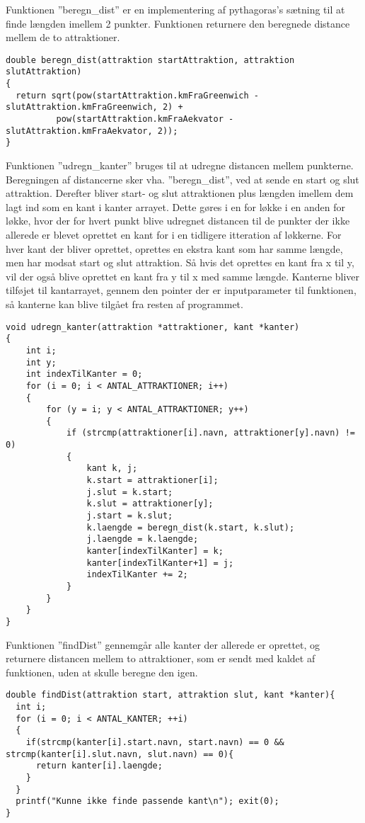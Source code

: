 Funktionen ”beregn\_dist” er en implementering af pythagoras's sætning til at finde længden imellem 2 punkter. Funktionen returnere den beregnede distance mellem de to attraktioner.

\begin{lstlisting}
double beregn_dist(attraktion startAttraktion, attraktion slutAttraktion)
{
  return sqrt(pow(startAttraktion.kmFraGreenwich - slutAttraktion.kmFraGreenwich, 2) + 
          pow(startAttraktion.kmFraAekvator - slutAttraktion.kmFraAekvator, 2));
}
\end{lstlisting}

Funktionen ”udregn\_kanter” bruges til at udregne distancen mellem punkterne. Beregningen af distancerne sker vha. ”beregn\_dist”, ved at sende en start og slut attraktion. Derefter bliver start- og slut attraktionen plus længden imellem dem lagt ind som en kant i kanter arrayet. Dette gøres i en for løkke i en anden for løkke, hvor der for hvert punkt blive udregnet distancen til de punkter der ikke allerede er blevet oprettet en kant for i en tidligere itteration af løkkerne. For hver kant der bliver oprettet, oprettes en ekstra kant som har samme længde, men har modsat start og slut attraktion. Så hvis det oprettes en kant fra x til y, vil der også blive oprettet en kant fra y til x med samme længde. Kanterne bliver tilføjet til kantarrayet, gennem den pointer der er inputparameter til funktionen, så kanterne kan blive tilgået fra resten af programmet. 

\begin{lstlisting}
void udregn_kanter(attraktion *attraktioner, kant *kanter)
{
	int i;
	int y;
	int indexTilKanter = 0;
	for (i = 0; i < ANTAL_ATTRAKTIONER; i++)
	{
		for (y = i; y < ANTAL_ATTRAKTIONER; y++)
		{
			if (strcmp(attraktioner[i].navn, attraktioner[y].navn) != 0)
			{
				kant k, j;
				k.start = attraktioner[i];
				j.slut = k.start;
				k.slut = attraktioner[y];
				j.start = k.slut;
				k.laengde = beregn_dist(k.start, k.slut);
				j.laengde = k.laengde;
				kanter[indexTilKanter] = k;
				kanter[indexTilKanter+1] = j;
				indexTilKanter += 2;
			}
		}
	}
}
\end{lstlisting}

Funktionen ”findDist” gennemgår alle kanter der allerede er oprettet, og returnere distancen mellem to attraktioner, som er sendt med kaldet af funktionen, uden at skulle beregne den igen.

\begin{lstlisting}
double findDist(attraktion start, attraktion slut, kant *kanter){
  int i;
  for (i = 0; i < ANTAL_KANTER; ++i)
  {
    if(strcmp(kanter[i].start.navn, start.navn) == 0 && strcmp(kanter[i].slut.navn, slut.navn) == 0){
      return kanter[i].laengde;
    }
  }
  printf("Kunne ikke finde passende kant\n"); exit(0);
}
\end{lstlisting}

